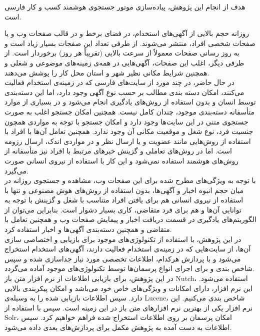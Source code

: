 
هدف از انجام این پژوهش، پیاده‌سازی موتور جستجوی هوشمند کسب و کار فارسی است.

روزانه حجم بالایی از آگهی‌های استخدام، در فضای برخط و در قالب صفحات وب و یا صفحات شخصی افراد، منتشر می‌شوند. از طرفی تعداد این صفحات بسیار زیاد است و به روز رسانی صفحات معمولاً از سرعت بالایی (تقریباً هر روز) برخوردار است. از طرفی دیگر، اغلب این صفحات، آگهی‌هایی در همه‌ی زمینه‌های موضوعی و شغلی و همچنین شرایط مکانی نظیر شهر و استان محل کار را پوشش می‌دهند.
\\
در حال حاضر، در چند مورد از سایت‌های فارسی که در زمینه‌ی استخدام فعالیت می‌کنند، امکان دسته بندی مطالب بر حسب نوع آگهی وجود دارد، اما این دسته‌بندی توسط انسان و بدون استفاده از روش‌های یادگیری انجام می‌شود و در بسیاری از موارد متأسفانه دسته‌بندی موجود، چندان کامل نیست. همچنین امکان جستجو اغلب به صورت جستجوی متنی در این سایت‌ها وجود دارد و امکان جستجو با توجه به مواردی همچون جنسیت فرد، نوع شغل و موقعیت مکانی آن وجود ندارد. همچنین تعامل آن‌ها با افراد با استفاده از روش‌هایی مانند عضویت و یا ارسال نظر و در مواردی اندک، ارسال رزومه است. اما در روش‌های تعاملی و گزینش خبرهای مرتبط با افراد نیز متأسفانه از روش‌های هوشمند استفاده نمی‌شود و این کار با استفاده از نیروی انسانی صورت می‌گیرد.
\\
با توجه به ویژگی‌های مطرح شده برای این صفحات وب، مشاهده و جستجوی روزانه در میان حجم انبوه اخبار و آگهی‌ها، بدون استفاده از روش‌های هوش مصنوعی و تنها با استفاده از نیروی انسانی هم برای یافتن افراد متناسب با شغل و گزینش با توجه به توانایی آن‌ها و هم برای فرد متقاضی، کاری بسیار دشوار است. بنابراین می‌توان از الگوریتم‌های یادگیری در قسمت دریافت اخبار و پیمایش صفحات وب و همچنین تعامل با متقاضی و همچنین دسته‌بندی آگهی‌ها و اخبار استفاده کرد.
\\
در این پژوهش، با استفاده از تکنولوژی‌های موجود برای بازیابی و اختصاصی سازی آن‌ها، از سایت‌هایی که در زمینه‌ی استخدام فعالیت دارند، آگهی‌های استخدام استخراج می‌شود و با پردازش هرکدام، اطلاعات تخصصی مورد نیاز جداسازی شده و سپس شاخص بندی و برای اجرای انواع پرسمان‌ها توسط تکنولوژی‌های موجود آماده می‌گردد.
\\
در این پژوهش، برای بازیابی اطلاعات از نرم افزار متن باز Nutch، استفاده می‌شود. این نرم افزار، دارای امکانات و ویژگی‌های خاص خود می‌باشد و امکان پیکربندی بالایی دارد. سپس اطلاعات بازیابی شده را به وسیله‌ی Lucene، شاخص بندی می‌کنیم. این نرم افزار یکی از بهترین نرم افزارهای متن باز در این زمینه است. سپس با استفاده از Solr، امکان پرسمان بر روی اطلاعات استخراج شده فراهم خواهیم کرد. سپس اطلاعات به دست آمده به پژوهش مکمل برای پردازش‌های بعدی داده می‌شود.
